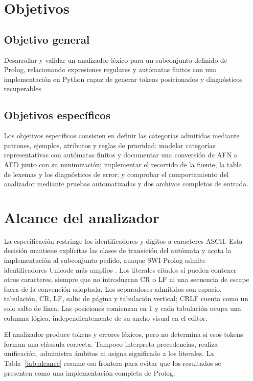 \section{Objetivos}

\subsection{Objetivo general}

Desarrollar y validar un analizador léxico para un subconjunto definido de Prolog, relacionando expresiones regulares y autómatas finitos con una implementación en Python capaz de generar tokens posicionados y diagnósticos recuperables.

\subsection{Objetivos específicos}

Los objetivos específicos consisten en definir las categorías admitidas mediante patrones, ejemplos, atributos y reglas de prioridad; modelar categorías representativas con autómatas finitos y documentar una conversión de AFN a AFD junto con su minimización; implementar el recorrido de la fuente, la tabla de lexemas y los diagnósticos de error; y comprobar el comportamiento del analizador mediante pruebas automatizadas y dos archivos completos de entrada.

\section{Alcance del analizador}

La especificación restringe los identificadores y dígitos a caracteres ASCII. Esta decisión mantiene explícitas las clases de transición del autómata y acota la implementación al subconjunto pedido, aunque SWI-Prolog admite identificadores Unicode más amplios \cite{swisyntax}. Los literales citados sí pueden contener otros caracteres, siempre que no introduzcan CR o LF ni una secuencia de escape fuera de la convención adoptada. Los separadores admitidos son espacio, tabulación, CR, LF, salto de página y tabulación vertical; CRLF cuenta como un solo salto de línea. Las posiciones comienzan en 1 y cada tabulación ocupa una columna lógica, independientemente de su ancho visual en el editor.

El analizador produce tokens y errores léxicos, pero no determina si esos tokens forman una cláusula correcta. Tampoco interpreta precedencias, realiza unificación, administra ámbitos ni asigna significado a los literales. La Tabla~\ref{tab:alcance} resume esa frontera para evitar que los resultados se presenten como una implementación completa de Prolog.

